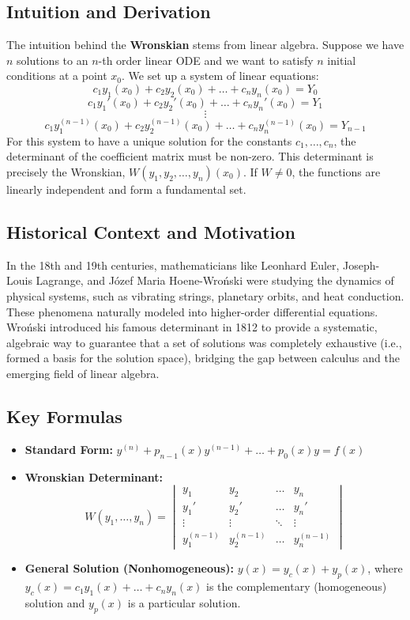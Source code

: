\documentclass[11pt, a4paper]{article}
\theoremstyle{definition}
\theoremstyle{remark}
\begin{document}
\subsection{Intuition and Derivation}
The intuition behind the \textbf{Wronskian} stems from linear algebra. Suppose we have $n$ solutions to an $n$-th order linear ODE and we want to satisfy $n$ initial conditions at a point $x_0$. We set up a system of linear equations:
\[ c_1 y_1(x_0) + c_2 y_2(x_0) + \dots + c_n y_n(x_0) = Y_0 \]
\[ c_1 y_1'(x_0) + c_2 y_2'(x_0) + \dots + c_n y_n'(x_0) = Y_1 \]
\[ \vdots \]
\[ c_1 y_1^{(n-1)}(x_0) + c_2 y_2^{(n-1)}(x_0) + \dots + c_n y_n^{(n-1)}(x_0) = Y_{n-1} \]
For this system to have a unique solution for the constants $c_1, \dots, c_n$, the determinant of the coefficient matrix must be non-zero. This determinant is precisely the Wronskian, $W(y_1, y_2, \dots, y_n)(x_0)$. If $W \neq 0$, the functions are linearly independent and form a fundamental set.

\subsection{Historical Context and Motivation}
In the 18th and 19th centuries, mathematicians like Leonhard Euler, Joseph-Louis Lagrange, and Józef Maria Hoene-Wroński were studying the dynamics of physical systems, such as vibrating strings, planetary orbits, and heat conduction. These phenomena naturally modeled into higher-order differential equations. Wroński introduced his famous determinant in 1812 to provide a systematic, algebraic way to guarantee that a set of solutions was completely exhaustive (i.e., formed a basis for the solution space), bridging the gap between calculus and the emerging field of linear algebra.

\subsection{Key Formulas}
\begin{itemize}
    \item \textbf{Standard Form:} $y^{(n)} + p_{n-1}(x)y^{(n-1)} + \dots + p_0(x)y = f(x)$
    \item \textbf{Wronskian Determinant:} 
    \[ W(y_1, \dots, y_n) = \begin{vmatrix} y_1 & y_2 & \dots & y_n \\ y_1' & y_2' & \dots & y_n' \\ \vdots & \vdots & \ddots & \vdots \\ y_1^{(n-1)} & y_2^{(n-1)} & \dots & y_n^{(n-1)} \end{vmatrix} \]
    \item \textbf{General Solution (Nonhomogeneous):} $y(x) = y_c(x) + y_p(x)$, where $y_c(x) = c_1 y_1(x) + \dots + c_n y_n(x)$ is the complementary (homogeneous) solution and $y_p(x)$ is a particular solution.
\end{itemize}
\end{document}
